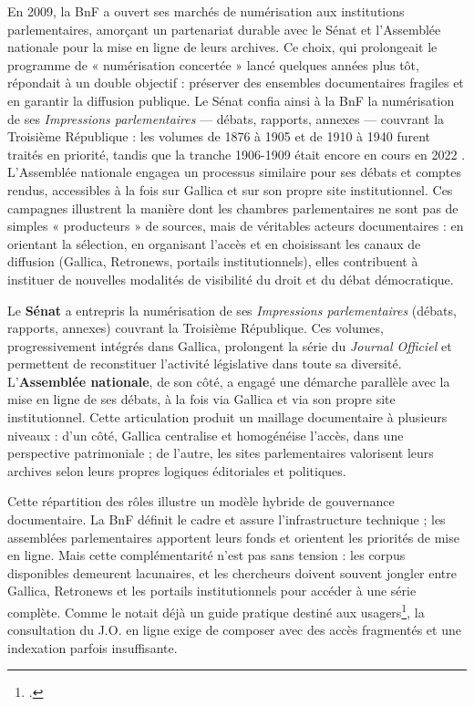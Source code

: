 En 2009, la BnF a ouvert ses marchés de numérisation aux institutions parlementaires, amorçant un partenariat durable avec le Sénat et l’Assemblée nationale pour la mise en ligne de leurs archives. Ce choix, qui prolongeait le programme de « numérisation concertée » lancé quelques années plus tôt, répondait à un double objectif : préserver des ensembles documentaires fragiles et en garantir la diffusion publique. Le Sénat confia ainsi à la BnF la numérisation de ses \emph{Impressions parlementaires} — débats, rapports, annexes — couvrant la Troisième République : les volumes de 1876 à 1905 et de 1910 à 1940 furent traités en priorité, tandis que la tranche 1906-1909 était encore en cours en 2022 . L’Assemblée nationale engagea un processus similaire pour ses débats et comptes rendus, accessibles à la fois sur Gallica et sur son propre site institutionnel. Ces campagnes illustrent la manière dont les chambres parlementaires ne sont pas de simples « producteurs » de sources, mais de véritables acteurs documentaires : en orientant la sélection, en organisant l’accès et en choisissant les canaux de diffusion (Gallica, Retronews, portails institutionnels), elles contribuent à instituer de nouvelles modalités de visibilité du droit et du débat démocratique.

Le \textbf{Sénat} a entrepris la numérisation de ses \emph{Impressions parlementaires} (débats, rapports, annexes) couvrant la Troisième République. Ces volumes, progressivement intégrés dans Gallica, prolongent la série du \emph{Journal Officiel} et permettent de reconstituer l’activité législative dans toute sa diversité. L’\textbf{Assemblée nationale}, de son côté, a engagé une démarche parallèle avec la mise en ligne de ses débats, à la fois via Gallica et via son propre site institutionnel. Cette articulation produit un maillage documentaire à plusieurs niveaux : d’un côté, Gallica centralise et homogénéise l’accès, dans une perspective patrimoniale ; de l’autre, les sites parlementaires valorisent leurs archives selon leurs propres logiques éditoriales et politiques.

Cette répartition des rôles illustre un modèle hybride de gouvernance documentaire. La BnF définit le cadre et assure l’infrastructure technique ; les assemblées parlementaires apportent leurs fonds et orientent les priorités de mise en ligne. Mais cette complémentarité n’est pas sans tension : les corpus disponibles demeurent lacunaires, et les chercheurs doivent souvent jongler entre Gallica, Retronews et les portails institutionnels pour accéder à une série complète. Comme le notait déjà un guide pratique destiné aux usagers\footcite[][]{ruiz}, la consultation du J.O. en ligne exige de composer avec des accès fragmentés et une indexation parfois insuffisante.

